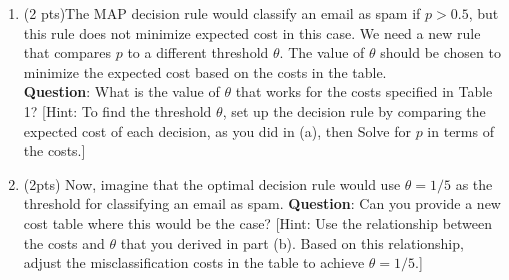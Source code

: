 \documentclass{article}
\begin{document}
\begin{enumerate}
\begin{enumerate}
\item (2 pts)The MAP decision rule would classify an email as spam if $p>0.5$, but this rule does not minimize expected cost in this case. We need a new rule that compares $p$ to a different threshold $\theta$. The value of $\theta$ should be chosen to minimize the expected cost based on the costs in the table.\\
\textbf{Question}: What is the value of $\theta$ that works for the costs specified in Table 1? [Hint: To find the threshold $\theta$, set up the decision rule by comparing the expected cost of each decision, as you did in (a), then Solve for $p$ in terms of the costs.]\\

\item (2pts) Now, imagine that the optimal decision rule would use $\theta=1/5$ as the threshold for classifying an email as spam. \textbf{Question}: Can you provide a new cost table where this would be the case? [Hint: Use the relationship between the costs and $\theta$ that you derived in part (b). Based on this relationship, adjust the misclassification costs in the table to achieve $\theta = 1/5$.]
\end{enumerate}
\end{enumerate}
\end{document}
